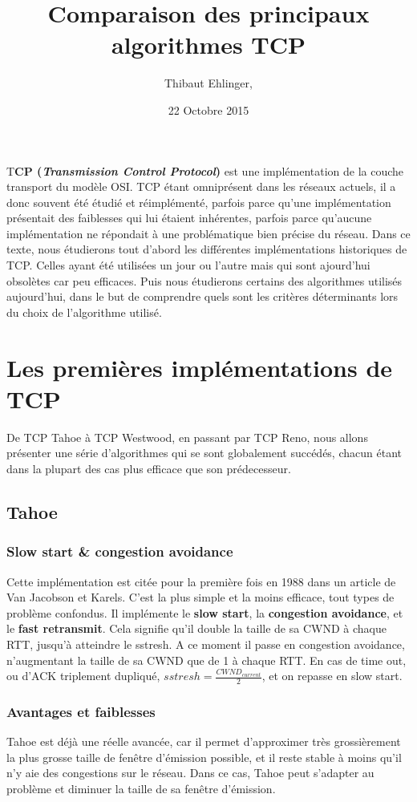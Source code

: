 \documentclass[	DIV=calc,%
							paper=a4,%
							fontsize=11pt,%
							twocolumn]{scrartcl}	 					%
\title{Comparaison des principaux algorithmes TCP}					%
\author{Thibaut Ehlinger, }											%
\date{22 Octobre 2015}
\newcommand{\initial}[1]{%
     \lettrine[lines=3,lhang=0.3,nindent=0em]{
     				\color{DarkGoldenrod}
     				{\textsf{#1}}}{}}
\begin{document}
\maketitle
\thispagestyle{fancy} 			%
\initial{T}\textbf{CP (\textit{Transmission Control Protocol})} est une implémentation de la couche transport du modèle OSI. TCP étant omniprésent dans les réseaux actuels, il a donc souvent été étudié et réimplémenté, parfois parce qu'une implémentation présentait des faiblesses qui lui étaient inhérentes, parfois parce qu'aucune implémentation ne répondait à une problématique bien précise du réseau. Dans ce texte, nous étudierons tout d'abord les différentes implémentations historiques de TCP. Celles ayant été utilisées un jour ou l'autre mais qui sont ajourd'hui obsolètes car peu efficaces. Puis nous étudierons certains des algorithmes utilisés aujourd'hui, dans le but de comprendre quels sont les critères déterminants lors du choix de l'algorithme utilisé.

\section*{Les premières implémentations de TCP}
De TCP Tahoe à TCP Westwood, en passant par TCP Reno, nous allons présenter une série d'algorithmes qui se sont globalement succédés, chacun étant dans la plupart des cas plus efficace que son prédecesseur.

\subsection*{Tahoe}
\subsubsection*{Slow start \& congestion avoidance}
Cette implémentation est citée pour la première fois en 1988 dans un article de Van Jacobson et Karels. C'est la plus simple et la moins efficace, tout types de problème confondus. Il implémente le \textbf{slow start}, la \textbf{congestion avoidance}, et le \textbf{fast retransmit}. 
Cela signifie qu'il double la taille de sa CWND à chaque RTT, jusqu'à atteindre le sstresh. A ce moment il passe en congestion avoidance, n'augmentant la taille de sa CWND que de 1 à chaque RTT. En cas de time out, ou d'ACK triplement dupliqué, $sstresh=\frac{CWND_{current}}{2}$, et on repasse en slow start.
\subsubsection*{Avantages et faiblesses}
Tahoe est déjà une réelle avancée, car il permet d'approximer très grossièrement la plus grosse taille de fenêtre d'émission possible, et il reste stable à moins qu'il n'y aie des congestions sur le réseau. Dans ce cas, Tahoe peut s'adapter au problème et diminuer la taille de sa fenêtre d'émission.
\end{document}
